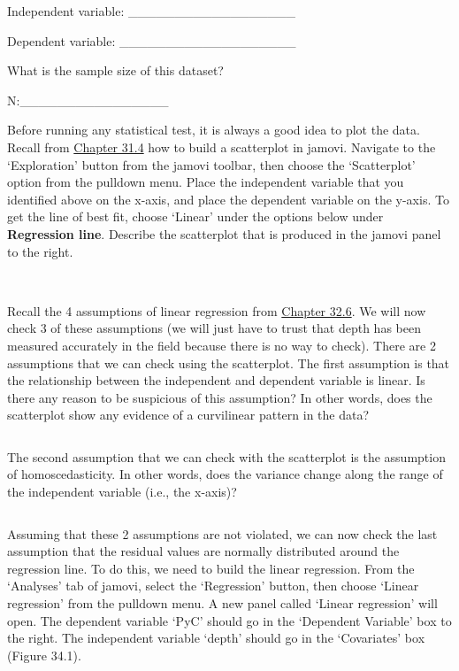 \documentclass[
  openany]{scrbook}
\begin{document}
Independent variable: \_\_\_\_\_\_\_\_\_\_\_\_\_\_\_\_\_\_

Dependent variable: \_\_\_\_\_\_\_\_\_\_\_\_\_\_\_\_\_\_\_

What is the sample size of this dataset?

N:\_\_\_\_\_\_\_\_\_\_\_\_\_\_\_\_

Before running any statistical test, it is always a good idea to plot the data.
Recall from \protect\hyperlink{pearson-product-moment-correlation-test}{Chapter 31.4} how to build a scatterplot in jamovi.
Navigate to the `Exploration' button from the jamovi toolbar, then choose the `Scatterplot' option from the pulldown menu.
Place the independent variable that you identified above on the x-axis, and place the dependent variable on the y-axis.
To get the line of best fit, choose `Linear' under the options below under \textbf{Regression line}.
Describe the scatterplot that is produced in the jamovi panel to the right.

\begin{verbatim}


\end{verbatim}

Recall the 4 assumptions of linear regression from \protect\hyperlink{regression-assumptions}{Chapter 32.6}.
We will now check 3 of these assumptions (we will just have to trust that depth has been measured accurately in the field because there is no way to check).
There are 2 assumptions that we can check using the scatterplot.
The first assumption is that the relationship between the independent and dependent variable is linear.
Is there any reason to be suspicious of this assumption?
In other words, does the scatterplot show any evidence of a curvilinear pattern in the data?

\begin{verbatim}

\end{verbatim}

The second assumption that we can check with the scatterplot is the assumption of homoscedasticity.
In other words, does the variance change along the range of the independent variable (i.e., the x-axis)?

\begin{verbatim}

\end{verbatim}

Assuming that these 2 assumptions are not violated, we can now check the last assumption that the residual values are normally distributed around the regression line.
To do this, we need to build the linear regression.
From the `Analyses' tab of jamovi, select the `Regression' button, then choose `Linear regression' from the pulldown menu.
A new panel called `Linear regression' will open.
The dependent variable `PyC' should go in the `Dependent Variable' box to the right.
The independent variable `depth' should go in the `Covariates' box (Figure 34.1).
\end{document}
